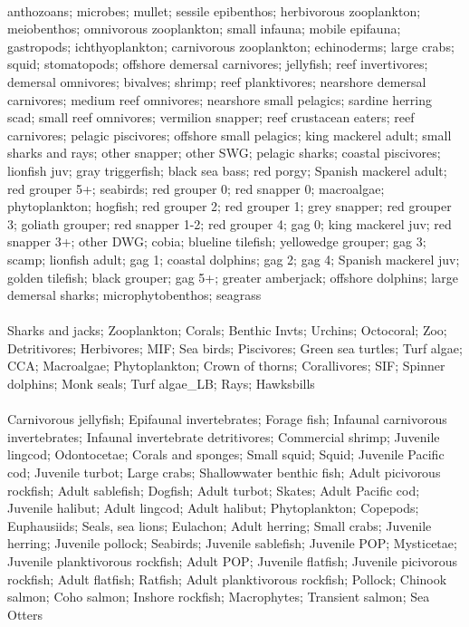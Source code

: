 \fullhline
\hline
{} \\
\hline
anthozoans; microbes; mullet; sessile epibenthos; herbivorous zooplankton; meiobenthos; omnivorous zooplankton; small infauna; mobile epifauna; gastropods; ichthyoplankton; carnivorous zooplankton; echinoderms; large crabs; squid; stomatopods; offshore demersal carnivores; jellyfish; reef invertivores; demersal omnivores; bivalves; shrimp; reef planktivores; nearshore demersal carnivores; medium reef omnivores; nearshore small pelagics; sardine herring scad; small reef omnivores; vermilion snapper; reef crustacean eaters; reef carnivores; pelagic piscivores; offshore small pelagics; king mackerel adult; small sharks and rays; other snapper; other SWG; pelagic sharks; coastal piscivores; lionfish juv; gray triggerfish; black sea bass; red porgy; Spanish mackerel adult; red grouper 5+; seabirds; red grouper 0; red snapper 0; macroalgae; phytoplankton; hogfish; red grouper 2; red grouper 1; grey snapper; red grouper 3; goliath grouper; red snapper 1-2; red grouper 4; gag 0; king mackerel juv; red snapper 3+; other DWG; cobia; blueline tilefish; yellowedge grouper; gag 3; scamp; lionfish adult; gag 1; coastal dolphins; gag 2; gag 4; Spanish mackerel juv; golden tilefish; black grouper; gag 5+; greater amberjack; offshore dolphins; large demersal sharks; microphytobenthos; seagrass\\
\fullhline
\hline
{} \\
\hline
Sharks and jacks; Zooplankton; Corals; Benthic Invts; Urchins; Octocoral; Zoo; Detritivores; Herbivores; MIF; Sea birds; Piscivores; Green sea turtles; Turf algae; CCA; Macroalgae; Phytoplankton; Crown of thorns; Corallivores; SIF; Spinner dolphins; Monk seals; Turf algae\_LB; Rays; Hawksbills\\
\fullhline
\hline
{} \\
\hline
Carnivorous jellyfish; Epifaunal invertebrates; Forage fish; Infaunal carnivorous invertebrates; Infaunal invertebrate detritivores; Commercial shrimp; Juvenile lingcod; Odontocetae; Corals and sponges; Small squid; Squid; Juvenile Pacific cod; Juvenile turbot; Large crabs; Shallowwater benthic fish; Adult picivorous rockfish; Adult sablefish; Dogfish; Adult turbot; Skates; Adult Pacific cod; Juvenile halibut; Adult lingcod; Adult halibut; Phytoplankton; Copepods; Euphausiids; Seals, sea lions; Eulachon; Adult herring; Small crabs; Juvenile herring; Juvenile pollock; Seabirds; Juvenile sablefish; Juvenile POP; Mysticetae; Juvenile planktivorous rockfish; Adult POP; Juvenile flatfish; Juvenile picivorous rockfish; Adult flatfish; Ratfish; Adult planktivorous rockfish; Pollock; Chinook salmon; Coho salmon; Inshore rockfish; Macrophytes; Transient salmon; Sea Otters\\
